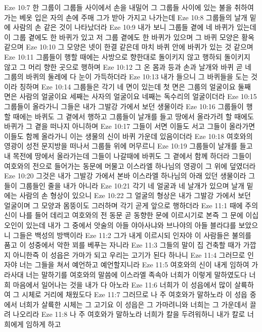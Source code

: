 Eze 10:7  한 그룹이 그룹들 사이에서 손을 내밀어 그 그룹들 사이에 있는 불을 취하여 가는 베옷 입은 자의 손에 주매 그가 받아 가지고 나가는데
Eze 10:8  그룹들의 날개 밑에 사람의 손 같은 것이 나타났더라
Eze 10:9  내가 보니 그룹들 곁에 네 바퀴가 있는데 이 그룹 곁에도 한 바퀴가 있고 저 그룹 곁에도 한 바퀴가 있으며 그 바퀴 모양은 황옥 같으며
Eze 10:10  그 모양은 넷이 한결 같은데 마치 바퀴 안에 바퀴가 있는 것 같으며
Eze 10:11  그룹들이 행할 때에는 사방으로 향한대로 돌이키지 않고 행하되 돌이키지 않고 그 머리 향한 곳으로 행하며
Eze 10:12  그 온 몸과 등과 손과 날개와 바퀴 곧 네 그룹의 바퀴의 둘레에 다 눈이 가득하더라
Eze 10:13  내가 들으니 그 바퀴들을 도는 것이라 칭하며
Eze 10:14  그룹들은 각기 네 면이 있는데 첫 면은 그룹의 얼굴이요 둘째 면은 사람의 얼굴이요 세째는 사자의 얼굴이요 네째는 독수리의 얼굴이더라
Eze 10:15  그룹들이 올라가니 그들은 내가 그발강 가에서 보던 생물이라
Eze 10:16  그룹들이 행할 때에는 바퀴도 그 곁에서 행하고 그룹들이 날개를 들고 땅에서 올라가려 할 때에도 바퀴가 그 곁을 떠나지 아니하며
Eze 10:17  그들이 서면 이들도 서고 그들이 올라가면 이들도 함께 올라가니 이는 생물의 신이 바퀴 가운데 있음이더라
Eze 10:18  여호와의 영광이 성전 문지방을 떠나서 그룹들 위에 머무르니
Eze 10:19  그룹들이 날개를 들고 내 목전에 땅에서 올라가는데 그들이 나갈때에 바퀴도 그 곁에서 함께 하더라 그들이 여호와의 전으로 들어가는 동문에 머물고 이스라엘 하나님의 영광이 그 위에 덮였더라
Eze 10:20  그것은 내가 그발강 가에서 본바 이스라엘 하나님의 아래 있던 생물이라 그들이 그룹들인 줄을 내가 아니라
Eze 10:21  각기 네 얼굴과 네 날개가 있으며 날개 밑에는 사람의 손 형상이 있으니
Eze 10:22  그 얼굴의 형상은 내가 그발강 가에서 보던 얼굴이며 그 모양과 몸뚱이도 그러하며 각기 곧게 앞으로 행하더라
Eze 11:1  때에 주의 신이 나를 들어 데리고 여호와의 전 동문 곧 동향한 문에 이르시기로 본즉 그 문에 이십 오인이 있는데 내가 그 중에서 앗술의 아들 야아사냐와 브나야의 아들 블라댜를 보았으니 그들은 백성의 방백이라
Eze 11:2  그가 내게 이르시되 인자야 이 사람들은 불의를 품고 이 성중에서 악한 꾀를 베푸는 자니라
Eze 11:3  그들의 말이 집 건축할 때가 가깝지 아니한즉 이 성읍은 가마가 되고 우리는 고기가 된다 하나니
Eze 11:4  그러므로 인자야 너는 그들을 쳐서 예언하고 예언할지니라
Eze 11:5  여호와의 신이 내게 임하여 가라사대 너는 말하기를 여호와의 말씀에 이스라엘 족속아 너희가 이렇게 말하였도다 너희 마음에서 일어나는 것을 내가 다 아노라
Eze 11:6  너희가 이 성읍에서 많이 살륙하여 그 시체로 거리에 채웠도다
Eze 11:7  그러므로 나 주 여호와가 말하노라 이 성읍 중에서 너희가 살륙한 시체는 그 고기요 이 성읍은 그 가마려니와 너희는 그 가운데서 끌려 나오리라
Eze 11:8  나 주 여호와가 말하노라 너희가 칼을 두려워하니 내가 칼로 너희에게 임하게 하고
